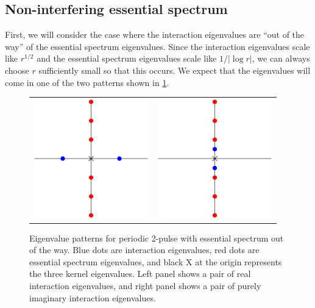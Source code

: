 \documentclass[thesis.tex]{subfiles}
\begin{document}
\subsection{Non-interfering essential spectrum }

First, we will consider the case where the interaction eigenvalues are ``out of the way'' of the essential spectrum eigenvalues. Since the interaction eigenvalues scale like $r^{1/2}$ and the essential spectrum eigenvalues scale like $1/|\log r|$, we can always choose $r$ sufficiently small so that this occurs. We expect that the eigenvalues will come in one of the two patterns shown in \cref{fig:2ppatterns}.

\begin{figure}[H]
\begin{center}
\begin{tabular}{cc}
\includegraphics[width=5cm]{images/kdv5/2punstableeigpattern.eps} &
\includegraphics[width=5cm]{images/kdv5/2pstableeigpattern.eps} 
\end{tabular}
\caption{Eigenvalue patterns for periodic 2-pulse with essential spectrum out of the way. Blue dots are interaction eigenvalues, red dots are essential spectrum eigenvalues, and black X at the origin represents the three kernel eigenvalues. Left panel shows a pair of real interaction eigenvalues, and right panel shows a pair of purely imaginary interaction eigenvalues. }
\label{fig:2ppatterns}
\end{center}
\end{figure}
\end{document}

